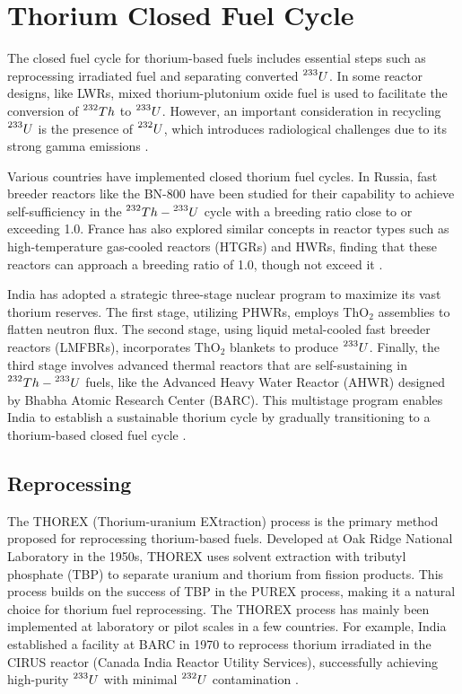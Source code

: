 \section{Thorium Closed Fuel Cycle}

The closed fuel cycle for thorium-based fuels includes essential steps such as reprocessing irradiated fuel and separating converted \(\prescript{233}{}{U}\). In some reactor designs, like LWRs, mixed thorium-plutonium oxide fuel is used to facilitate the conversion of \(\prescript{232}{}{Th}\) to \(\prescript{233}{}{U}\). However, an important consideration in recycling \(\prescript{233}{}{U}\) is the presence of \(\prescript{232}{}{U}\), which introduces radiological challenges due to its strong gamma emissions \cite{IAEA_Th_Potential}.

Various countries have implemented closed thorium fuel cycles. In Russia, fast breeder reactors like the BN-800 have been studied for their capability to achieve self-sufficiency in the \(\prescript{232}{}{Th}-\prescript{233}{}{U}\) cycle with a breeding ratio close to or exceeding 1.0. France has also explored similar concepts in reactor types such as high-temperature gas-cooled reactors (HTGRs) and HWRs, finding that these reactors can approach a breeding ratio of 1.0, though not exceed it \cite{IAEA_Th_Potential}.

India has adopted a strategic three-stage nuclear program to maximize its vast thorium reserves. The first stage, utilizing PHWRs, employs \(\text{ThO}_2\) assemblies to flatten neutron flux. The second stage, using liquid metal-cooled fast breeder reactors (LMFBRs), incorporates \(\text{ThO}_2\) blankets to produce \(\prescript{233}{}{U}\). Finally, the third stage involves advanced thermal reactors that are self-sustaining in \(\prescript{232}{}{Th}-\prescript{233}{}{U}\) fuels, like the Advanced Heavy Water Reactor (AHWR) designed by Bhabha Atomic Research Center (BARC). This multistage program enables India to establish a sustainable thorium cycle by gradually transitioning to a thorium-based closed fuel cycle \cite{IAEA_Th_Potential}.

\subsection{Reprocessing}

The THOREX (Thorium-uranium EXtraction) process is the primary method proposed for reprocessing thorium-based fuels. Developed at Oak Ridge National Laboratory in the 1950s, THOREX uses solvent extraction with tributyl phosphate (TBP) to separate uranium and thorium from fission products. This process builds on the success of TBP in the PUREX process, making it a natural choice for thorium fuel reprocessing. The THOREX process has mainly been implemented at laboratory or pilot scales in a few countries. For example, India established a facility at BARC in 1970 to reprocess thorium irradiated in the CIRUS reactor (Canada India Reactor Utility Services), successfully achieving high-purity \(\prescript{233}{}{U}\) with minimal \(\prescript{232}{}{U}\) contamination \cite{IAEA_Th_Potential,fuel_cycle_book}.

